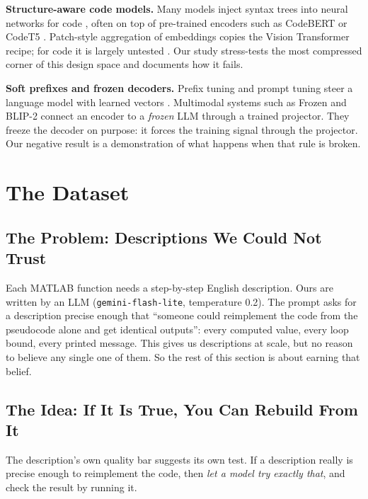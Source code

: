 \documentclass[conference]{IEEEtran}
\begin{document}
\textbf{Structure-aware code models.} Many models inject syntax trees into neural networks for code \cite{10.1007/s10664-023-10378-9,shi-etal-2021-cast,10.5555/3304222.3304348,10.5555/3524938.3524962,10.1109/ICSE43902.2021.00026}, often on top of pre-trained encoders such as CodeBERT or CodeT5 \cite{wang-etal-2021-codet5}. Patch-style aggregation of embeddings copies the Vision Transformer recipe; for code it is largely untested \cite{soselia2023learning}. Our study stress-tests the most compressed corner of this design space and documents how it fails.

\textbf{Soft prefixes and frozen decoders.} Prefix tuning and prompt tuning steer a language model with learned vectors \cite{li2021prefix,lester2021power}. Multimodal systems such as Frozen \cite{tsimpoukelli2021frozen} and BLIP-2 \cite{li2023blip2} connect an encoder to a \emph{frozen} LLM through a trained projector. They freeze the decoder on purpose: it forces the training signal through the projector. Our negative result is a demonstration of what happens when that rule is broken.

\section{The Dataset}
\label{sec:dataset}

\subsection{The Problem: Descriptions We Could Not Trust}
Each MATLAB function needs a step-by-step English description. Ours are written by an LLM (\texttt{gemini-flash-lite}, temperature 0.2). The prompt asks for a description precise enough that ``someone could reimplement the code from the pseudocode alone and get identical outputs'': every computed value, every loop bound, every printed message. This gives us descriptions at scale, but no reason to believe any single one of them. So the rest of this section is about earning that belief.

\subsection{The Idea: If It Is True, You Can Rebuild From It}
The description's own quality bar suggests its own test. If a description really is precise enough to reimplement the code, then \emph{let a model try exactly that}, and check the result by running it.
\end{document}
